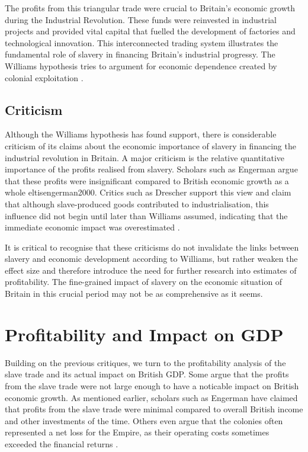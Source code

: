 \documentclass[a4paper,11pt]{article}
\begin{document}
The profits from this triangular trade were crucial to Britain's economic growth during the Industrial Revolution. These funds were reinvested in industrial projects and provided vital capital that fuelled the development of factories and technological innovation. This interconnected trading system illustrates the fundamental role of slavery in financing Britain's industrial progressy. The Williams hypothesis tries to argument for economic dependence created by colonial exploitation \citep{solow1985}.

\subsection{Criticism}

Although the Williams hypothesis has found support, there is considerable criticism of its claims about the economic importance of slavery in financing the industrial revolution in Britain. A major criticism is the relative quantitative importance of the profits realised from slavery. Scholars such as Engerman argue that these profits were insignificant compared to British economic growth as a whole {eltisengerman2000}. Critics such as Drescher support this view and claim that although slave-produced goods contributed to industrialisation, this influence did not begin until later than Williams assumed, indicating that the immediate economic impact was overestimated \citep{drescher1997}.

It is critical to recognise that these criticisms do not invalidate the links between slavery and economic development according to Williams, but rather weaken the effect size and therefore introduce the need for further research into estimates of profitability. The fine-grained impact of slavery on the economic situation of Britain in this crucial period may not be as comprehensive as it seems.

\section{Profitability and Impact on GDP}

Building on the previous critiques, we turn to the profitability analysis of the slave trade and its actual impact on British GDP. Some argue that the profits from the slave trade were not large enough to have a noticable impact on British economic growth. As mentioned earlier, scholars such as Engerman have claimed that profits from the slave trade were minimal compared to overall British income and other investments of the time. Others even argue that the colonies often represented a net loss for the Empire, as their operating costs sometimes exceeded the financial returns \citep{eltisengerman2000}.
\end{document}
